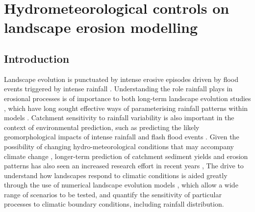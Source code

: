 \chapter{Hydrometeorological controls on landscape erosion modelling}
\label{chapter_hydrogeomorph}


\section{Introduction}

Landscape evolution is punctuated by intense erosive episodes driven by flood events triggered by intense rainfall \citep{Wolman1960,newson1980geomorphological,Costa1995}. Understanding the role rainfall plays in erosional processes is of importance to both long-term landscape evolution studies \citep[e.g.][]{rinaldo1995geomorphological,tucker1997drainage,Tucker2000}, which have long sought effective ways of parameterising rainfall patterns within models \citep[e.g][]{Eagleson1978}.  Catchment sensitivity to rainfall variability is also important in the context of environmental prediction, such as predicting the likely geomorphological impacts of intense rainfall and flash flood events \citep[e.g.][]{lane2007interactions,deluis2010rainfall,milan2012geomorphic}. Given the possibility of changing hydro-meteorological conditions that may accompany climate change \citep{Kendon2014}, longer-term prediction of catchment sediment yields and erosion patterns has also seen an increased research effort in recent years \citep{coulthard2000modelling,Coulthard2012,hancock2017sediment}, The drive to understand how landscapes respond to climatic conditions is aided greatly through the use of numerical landscape evolution models \citep{Tucker2010}, which allow a wide range of scenarios to be tested, and quantify the sensitivity of particular processes to climatic boundary conditions, including rainfall distribution.

